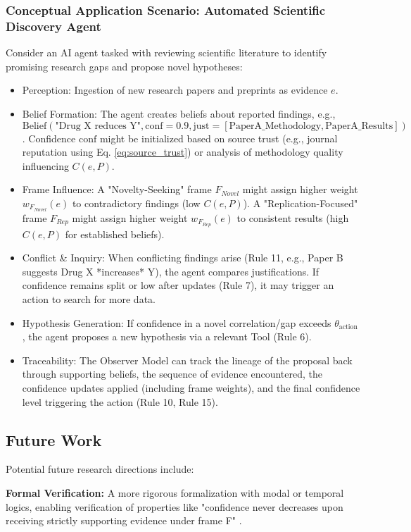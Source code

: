 \documentclass[10pt,a4paper]{article}
\begin{document}
\subsubsection{Conceptual Application Scenario: Automated Scientific Discovery Agent}
Consider an AI agent tasked with reviewing scientific literature to identify promising research gaps and propose novel hypotheses:
\begin{itemize}
\item Perception: Ingestion of new research papers and preprints as evidence $e$.
\item Belief Formation: The agent creates beliefs about reported findings, e.g., $\mathrm{Belief}(\text{"Drug X reduces Y"}, \mathrm{conf}=0.9, \mathrm{just}=[\text{PaperA\_Methodology}, \text{PaperA\_Results}])$. Confidence $\mathrm{conf}$ might be initialized based on source trust (e.g., journal reputation using Eq. \ref{eq:source_trust}) or analysis of methodology quality influencing $C(e, P)$.
\item Frame Influence: A "Novelty-Seeking" frame $F_{Novel}$ might assign higher weight $w_{F_{Novel}}(e)$ to contradictory findings (low $C(e, P)$). A "Replication-Focused" frame $F_{Rep}$ might assign higher weight $w_{F_{Rep}}(e)$ to consistent results (high $C(e, P)$ for established beliefs).
\item Conflict \& Inquiry: When conflicting findings arise (Rule 11, e.g., Paper B suggests Drug X *increases* Y), the agent compares justifications. If confidence remains split or low after updates (Rule 7), it may trigger an action to search for more data.
\item Hypothesis Generation: If confidence in a novel correlation/gap exceeds $\theta_{\mathrm{action}}$, the agent proposes a new hypothesis via a relevant Tool (Rule 6).
\item Traceability: The Observer Model can track the lineage of the proposal back through supporting beliefs, the sequence of evidence encountered, the confidence updates applied (including frame weights), and the final confidence level triggering the action (Rule 10, Rule 15).
\end{itemize}

\subsection{Future Work}
Potential future research directions include:

\textbf{Formal Verification:} A more rigorous formalization with modal or temporal logics, enabling verification of properties like "confidence never decreases upon receiving strictly supporting evidence under frame F" \citep{fagin2003reasoning, formal_verification}.
\end{document}
